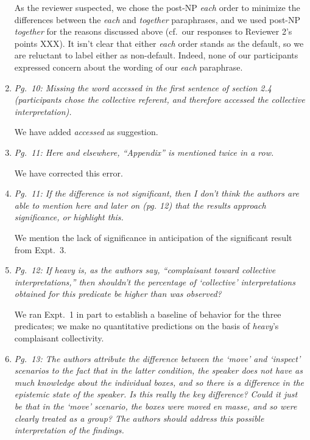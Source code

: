 \documentclass[12pt]{article}
\begin{document}
\begin{enumerate}
As the reviewer suspected, we chose the post-NP \emph{each} order to minimize the differences between the \emph{each} and \emph{together} paraphrases, and we used post-NP \emph{together} for the reasons discussed above (cf.~our responses to Reviewer 2's points XXX). It isn't clear that either \emph{each} order stands as the default, so we are reluctant to label either as non-default. Indeed, none of our participants expressed concern about the wording of our \emph{each} paraphrase.
	
\item \emph{Pg.~10: Missing the word \emph{accessed} in the first sentence of section 2.4 (\emph{participants chose the collective referent, and therefore accessed the collective interpretation}).}

We have added \emph{accessed} as suggestion.

\item \emph{Pg.~11: Here and elsewhere, ``Appendix'' is mentioned twice in a row.}

We have corrected this error.

\item \emph{Pg.~11: If the difference is not significant, then I don't think the authors are able to mention here and later on (pg. 12) that the results approach significance, or highlight this.}

We mention the lack of significance in anticipation of the significant result from Expt.~3.

\item \emph{Pg.~12: If \emph{heavy} is, as the authors say, ``complaisant toward collective interpretations,'' then shouldn't the percentage of `collective' interpretations obtained for this predicate be higher than was observed?}

We ran Expt.~1 in part to establish a baseline of behavior for the three predicates; we make no quantitative predictions on the basis of \emph{heavy}'s complaisant collectivity.

\item \emph{Pg.~13: The authors attribute the difference between the `move' and `inspect' scenarios to the fact that in the latter condition, the speaker does not have as much knowledge about the individual boxes, and so there is a difference in the epistemic state of the speaker. Is this really the key difference? Could it just be that in the `move' scenario, the boxes were moved en masse, and so were clearly treated as a group? The authors should address this possible interpretation of the findings.}


\end{enumerate}
\end{document}
